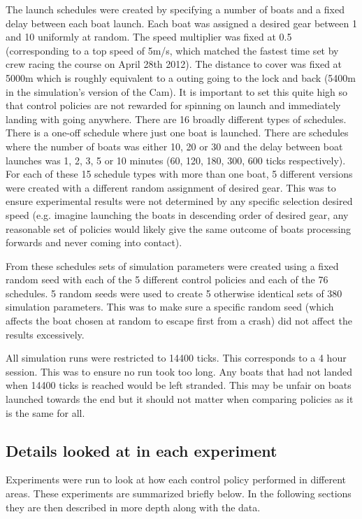  The launch schedules were created by specifying a number of boats
  and a fixed delay between each boat launch. Each boat was assigned a
  desired gear between 1 and 10 uniformly at random. The speed
  multiplier was fixed at 0.5 (corresponding to a top speed of 5m/s,
  which matched the fastest time set by crew racing the course on
  April 28th 2012). The distance to cover was fixed at 5000m which is
  roughly equivalent to a outing going to the lock and back (5400m in
  the simulation's version of the Cam). It is important to set this
  quite high so that control policies are not rewarded for spinning on
  launch and immediately landing with going anywhere. There are 16 broadly different types of schedules. There is a one-off schedule where just one boat is launched. There are schedules where the number of boats was either 10, 20 or 30 and the delay between boat launches was 1, 2, 3, 5 or 10 minutes (60, 120, 180, 300, 600 ticks respectively).  For each of these 15 schedule types with more than one boat, 5 different versions were created with a different random assignment of desired gear. This was to ensure experimental results were not determined by any specific selection desired speed (e.g. imagine launching the boats in descending order of desired gear, any reasonable set of policies would likely give the same outcome of boats processing forwards and never coming into contact).
  
  From these schedules sets of simulation parameters were created
  using a fixed random seed with each of the 5 different control
  policies and each of the 76 schedules. 5 random seeds were used to
  create 5 otherwise identical sets of 380 simulation parameters. This
  was to make sure a specific random seed (which affects the boat
  chosen at random to escape first from a crash) did not affect the
  results excessively.

  All simulation runs were restricted to 14400 ticks. This corresponds
  to a 4 hour session. This was to ensure no run took too long. Any
  boats that had not landed when 14400 ticks is reached would be left
  stranded. This may be unfair on boats launched towards the end but
  it should not matter when comparing policies as it is the same for all.
  
  \subsection{Details looked at in each experiment}
  Experiments were run to look at how each control policy performed in
  different areas. These experiments are summarized briefly below. In
  the following sections they are then described in more depth along
  with the data.

